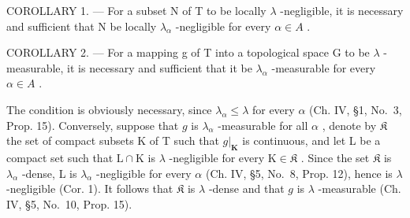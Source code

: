 COROLLARY 1. --- For a subset N of T to be locally \(\lambda\) -negligible, it is necessary and sufficient that N be locally \(\lambda_{\alpha}\) -negligible for every \(\alpha \in A\) .

COROLLARY 2. --- For a mapping g of T into a topological space G to be \(\lambda\) -measurable, it is necessary and sufficient that it be \(\lambda_{\alpha}\) -measurable for every \(\alpha \in A\) .

The condition is obviously necessary, since \(\lambda_{\alpha} \leqslant \lambda\) for every \(\alpha\) (Ch. IV, §1, No.~3, Prop. 15). Conversely, suppose that \(g\) is \(\lambda_{\alpha}\) -measurable for all \(\alpha\) , denote by \(\mathfrak{K}\) the set of compact subsets K of T such that \(g|_{\mathbf{K}}\) is continuous, and let L be a compact set such that \(\mathrm{L} \cap \mathrm{K}\) is \(\lambda\) -negligible for every \(\mathrm{K} \in \mathfrak{K}\) . Since the set \(\mathfrak{K}\) is \(\lambda_{\alpha}\) -dense, L is \(\lambda_{\alpha}\) -negligible for every \(\alpha\) (Ch. IV, §5, No.~8, Prop. 12), hence is \(\lambda\) -negligible (Cor. 1). It follows that \(\mathfrak{K}\) is \(\lambda\) -dense and that \(g\) is \(\lambda\) -measurable (Ch. IV, §5, No.~10, Prop. 15).

